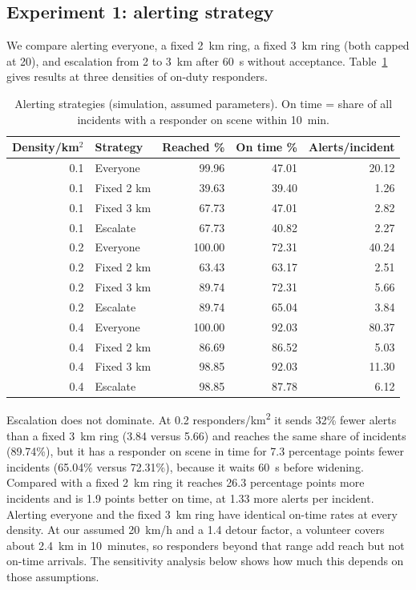 \documentclass[conference]{IEEEtran}
\begin{document}
\subsection{Experiment 1: alerting strategy}
We compare alerting everyone, a fixed 2~km ring, a fixed 3~km ring (both capped at 20), and escalation from 2 to 3~km after 60~s without acceptance. Table~\ref{tab:e1} gives results at three densities of on-duty responders.

\begin{table}[t]
\caption{Alerting strategies (simulation, assumed parameters). On time = share of all incidents with a responder on scene within 10~min.}
\label{tab:e1}
\centering
\small
\begin{tabular}{@{}rlrrr@{}}
\toprule
Density/km$^2$ & Strategy & Reached \% & On time \% & Alerts/incident \\
\midrule
0.1 & Everyone & 99.96 & 47.01 & 20.12 \\
0.1 & Fixed 2 km & 39.63 & 39.40 & 1.26 \\
0.1 & Fixed 3 km & 67.73 & 47.01 & 2.82 \\
0.1 & Escalate & 67.73 & 40.82 & 2.27 \\
\midrule
0.2 & Everyone & 100.00 & 72.31 & 40.24 \\
0.2 & Fixed 2 km & 63.43 & 63.17 & 2.51 \\
0.2 & Fixed 3 km & 89.74 & 72.31 & 5.66 \\
0.2 & Escalate & 89.74 & 65.04 & 3.84 \\
\midrule
0.4 & Everyone & 100.00 & 92.03 & 80.37 \\
0.4 & Fixed 2 km & 86.69 & 86.52 & 5.03 \\
0.4 & Fixed 3 km & 98.85 & 92.03 & 11.30 \\
0.4 & Escalate & 98.85 & 87.78 & 6.12 \\
\bottomrule
\end{tabular}
\end{table}

Escalation does not dominate. At 0.2 responders/km\textsuperscript{2} it sends 32\% fewer alerts than a fixed 3~km ring (3.84 versus 5.66) and reaches the same share of incidents (89.74\%), but it has a responder on scene in time for 7.3 percentage points fewer incidents (65.04\% versus 72.31\%), because it waits 60~s before widening. Compared with a fixed 2~km ring it reaches 26.3 percentage points more incidents and is 1.9 points better on time, at 1.33 more alerts per incident. Alerting everyone and the fixed 3~km ring have identical on-time rates at every density. At our assumed 20~km/h and a 1.4 detour factor, a volunteer covers about 2.4~km in 10~minutes, so responders beyond that range add reach but not on-time arrivals. The sensitivity analysis below shows how much this depends on those assumptions.
\end{document}

